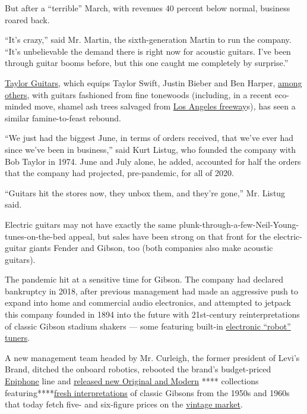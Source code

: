 But after a ``terrible'' March, with revenues 40 percent below normal,
business roared back.

``It's crazy,'' said Mr. Martin, the sixth-generation Martin to run the
company. ``It's unbelievable the demand there is right now for acoustic
guitars. I've been through guitar booms before, but this one caught me
completely by surprise.''

\href{https://www.taylorguitars.com/}{Taylor Guitars}, which equips
Taylor Swift, Justin Bieber and Ben Harper,
\href{https://www.taylorguitars.com/artists}{among others}, with guitars
fashioned from fine tonewoods (including, in a recent eco-minded move,
shamel ash trees salvaged from
\href{https://www.rollingstone.com/pro/features/taylor-guitars-highway-trees-989888/}{Los
Angeles freeway}s)\emph{,} has seen a similar famine-to-feast rebound.

``We just had the biggest June, in terms of orders received, that we've
ever had since we've been in business,'' said Kurt Listug, who founded
the company with Bob Taylor in 1974. June and July alone, he added,
accounted for half the orders that the company had projected,
pre-pandemic, for all of 2020.

``Guitars hit the stores now, they unbox them, and they're gone,'' Mr.
Listug said.

Electric guitars may not have exactly the same
plunk-through-a-few-Neil-Young-tunes-on-the-bed appeal, but sales have
been strong on that front for the electric-guitar giants Fender and
Gibson, too (both companies also make acoustic guitars).

The pandemic hit at a sensitive time for Gibson. The company had
declared bankruptcy in 2018, after previous management had made an
aggressive push to expand into home and commercial audio electronics,
and attempted to jetpack this company founded in 1894 into the future
with 21st-century reinterpretations of classic Gibson stadium shakers
--- some featuring built-in
\href{https://www.youtube.com/watch?v=zb7G6KbwCpE\&t=279s}{electronic
``robot'' tuners}.

A new management team headed by Mr. Curleigh, the former president of
Levi's Brand, ditched the onboard robotics, rebooted the brand's
budget-priced \href{https://www.epiphone.com/}{Epiphone} line and
\href{https://www.gearnews.com/namm-2020-gibson-announces-new-models-for-original-collection-and-modern-collection/}{released
new Original and Modern} **** collections
featuring**\href{https://guitar.com/news/gear-news/gibson-2020-full-line-up-revealed/}{}**\href{https://guitar.com/news/gear-news/gibson-2020-full-line-up-revealed/}{fresh
interpretations} of classic Gibsons from the 1950s and 1960s that today
fetch five- and six-figure prices on the
\href{https://www.antiquesandthearts.com/1959-gibson-les-paul-standard-burst-takes-216000-at-westport-auction/}{vintage
market}.

